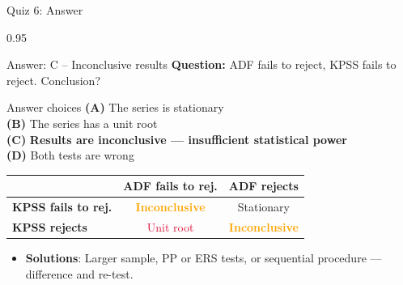 \documentclass[9pt, aspectratio=169, t]{beamer}
\begin{document}
\begin{frame}{Quiz 6: Answer}
    \begin{cminipage}{0.95\textwidth}
    \begin{exampleblock}{Answer: C -- Inconclusive results}
        \textbf{Question:} ADF fails to reject, KPSS fails to reject. Conclusion?

        \vspace{0.3cm}

    \begin{block}{Answer choices}
        \textcolor{MainBlue}{\textbf{(A)}} The series is stationary \incorrect\\[3pt]
        \textcolor{MainBlue}{\textbf{(B)}} The series has a unit root \incorrect\\[3pt]
        \textcolor{MainBlue}{\textbf{(C)}} \textbf{\textcolor{Forest}{Results are inconclusive --- insufficient statistical power}} \correct\\[3pt]
        \textcolor{MainBlue}{\textbf{(D)}} Both tests are wrong \incorrect
    \end{block}

        \vspace{0.3cm}

        \vspace{-0.2cm}
        \begin{center}
        \small
        \begin{tabular}{l|cc}
            & \textbf{ADF fails to rej.} & \textbf{ADF rejects} \\
            \hline
            \textbf{KPSS fails to rej.} & \textcolor{Orange}{\textbf{Inconclusive}} & \textcolor{Forest}{Stationary} \\
            \textbf{KPSS rejects} & \textcolor{Crimson}{Unit root} & \textcolor{Orange}{\textbf{Inconclusive}} \\
        \end{tabular}
        \end{center}
        \vspace{-0.1cm}
        {\footnotesize
        \begin{itemize}\setlength{\itemsep}{0pt}
            \item \textbf{Solutions}: Larger sample, PP or ERS tests, or sequential procedure --- difference and re-test.
        \end{itemize}
        }
    \end{exampleblock}

    \end{cminipage}
\end{frame}
\end{document}
